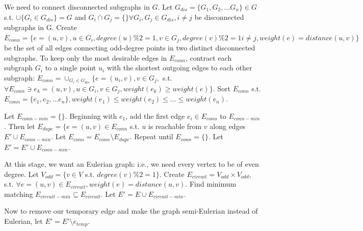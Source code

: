 We need to connect disconnected subgraphs in $G$.  Let $G_{dis} = \{G_1, G_2, ... G_n\} \in G$ s.t. $\cup{\{G_i \in G_{dis}\}} = G$ and $G_i \cap G_j  = \{ \} \forall G_i, G_j \in G_{dis}, i\neq j$ be disconnected subgraphs in G.  Create $E_{conn} = \{e = (u, v), u \in G_i, degree(u)\%2 = 1, v \in G_j, degree(v) \%2 = 1 i \neq j, weight(e) = distance(u, v)\}$ be the set of all edges connecting odd-degree points in two distinct disconnected subgraphs.  To keep only the most desirable edges in $E_{conn}$, contract each subgraph $G_i$ to a single point $u_i$ with the shortest outgoing edges to each other subgraph: $E_{conn} = \cup_{G_i \in G_{dis}} \{e=(u_i, v), v \in G_j,$ s.t. $\forall E_{conn} \ni e_k = (u, v), u \in G_i, v \in G_j, weight(e_k) \geq weight(e)\}$.  Sort $E_{conn}$ s.t. $E_{conn} = \{e_1, e_2, ... e_n\}, weight(e_1) \leq weight(e_2) \leq \ldots \leq weight(e_n)$.

Let $E_{conn-min} = \{ \}$.  Beginning with $e_1$, add the first edge $e_i \in E_{conn}$ to $E_{conn-min}$.  Then let $E_{dupe} = \{ e = (u, v) \in E_{conn}$ s.t. $u$  is reachable from $v$ along edges $E' \cup E_{conn-min}$.  Let $E_{conn} = E_{conn} \setminus E_{dupe}$.  Repeat until $E_{conn} = \{ \}$.  Let $E' = E' \cup E_{conn-min}$.

At this stage, we want an Eulerian graph: i.e., we need every vertex to be of even degree.  Let $V_{odd} = \{ v \in V$ s.t. $degree(v) \% 2 = 1 \}$.  Create $E_{circuit} = V_{odd} \times V_{odd}$, s.t. $\forall e=(u,v) \in E_{circuit}, weight(e) = distance(u, v)$.  Find minimum matching $E_{circuit-min} \subseteq E_{circuit}$.  Let $E' = E \cup E_{circuit-min}$.

Now to remove our temporary edge and make the graph semi-Eulerian instead of Eulerian, let $E' = E' \setminus e_{temp}$.

